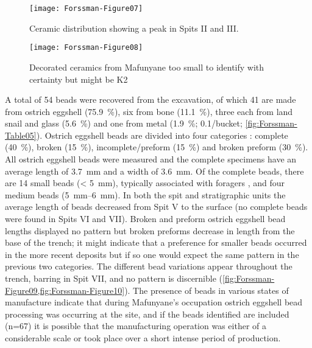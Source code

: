	\begin{figure} %
		\texttt{[image: Forssman-Figure07]}
		\caption{Ceramic distribution showing a peak in Spits II and III.}
		\label{fig:Forssman-Figure07}
	\end{figure}
	
		\begin{figure} %
			\texttt{[image: Forssman-Figure08]}
			\caption{Decorated ceramics from Mafunyane too small to identify with certainty but might be K2}
			\label{fig:Forssman-Figure08}
		\end{figure}


A total of 54  beads were recovered from the excavation, of which 41 are made from ostrich eggshell (\SI{75.9}{\percent}), 
six from bone (\SI{11.1}{\percent}), 
three each from land snail and glass (\SI{5.6}{\percent}) and one from metal (\SI{1.9}{\percent}; 0.1/bucket; \cref{fig:Forssman-Table05}). Ostrich eggshell beads are divided into four categories \parencite[after][]{Orton_2008}: 
complete (\SI{40}{\percent}), broken (\SI{15}{\percent}), 
incomplete/preform (\SI{15}{\percent}) and broken preform (\SI{30}{\percent}). 
All ostrich eggshell beads were measured and the complete specimens have an average length of 
\SI{3.7}{\milli\meter} and a width of \SI{3.6}{\milli\meter}. 
Of the complete beads, there are 14 small beads (< \SI{5}{\milli\meter}), 
typically associated with foragers \parencite[c.f.][]{Orton_2014}, and four medium beads (\SIrange{5}{6}{\milli\meter}). 
In both the spit and stratigraphic units the average length of beads decreased from Spit V to the surface (no complete beads were found in Spits VI and VII). 
Broken and preform ostrich eggshell bead lengths displayed no pattern but broken preforms decrease in length from the base of the trench; it might indicate that a preference for smaller beads occurred in the more recent deposits but if so one would expect the same pattern in the previous two categories. The different bead variations appear throughout the trench, barring in Spit VII,
 and no pattern is discernible (\cref{fig:Forssman-Figure09,fig:Forssman-Figure10}). 
 The presence of beads in various states of manufacture indicate that during Mafunyane’s occupation ostrich eggshell bead processing was occurring at the site, 
 and if the beads \textcite{Walker_1994} identified are included (n=67) it is possible that the manufacturing operation was either of a considerable scale or took place over a short intense period of production. 
 
